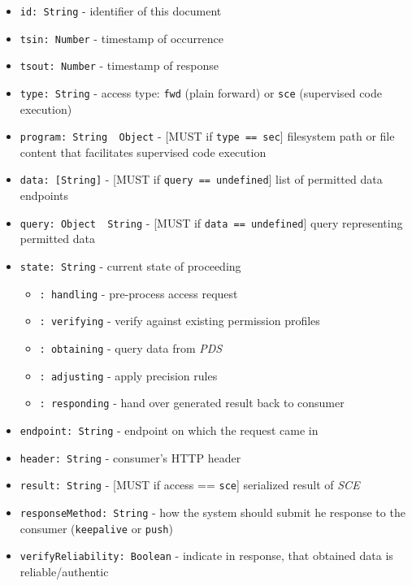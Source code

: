 \documentclass[12pt,english,a4paper,titlepage,cleardoublepage=empty,dottedtoc]{report}
\providecommand{\tightlist}{%
  \setlength{\itemsep}{0pt}\setlength{\parskip}{0pt}}
\begin{document}
\begin{itemize}
\tightlist
\item
  \texttt{id:\ String} - identifier of this document
\item
  \texttt{tsin:\ Number} - timestamp of occurrence
\item
  \texttt{tsout:\ Number} - timestamp of response
\item
  \texttt{type:\ String} - access type: \texttt{fwd} (plain forward) or
  \texttt{sce} (supervised code execution)
\item
  \texttt{program:\ String\ \textbar{}\textbar{}\ Object} - {[}MUST if
  \texttt{type\ ==\ \textquotesingle{}sec\textquotesingle{}}{]}
  filesystem path or file content that facilitates supervised code
  execution
\item
  \texttt{data:\ {[}String{]}} - {[}MUST if
  \texttt{query\ ==\ undefined}{]} list of permitted data endpoints
\item
  \texttt{query:\ Object\ \textbar{}\textbar{}\ String} - {[}MUST if
  \texttt{data\ ==\ undefined}{]} query representing permitted data
\item
  \texttt{state:\ String} - current state of proceeding

  \begin{itemize}
  \tightlist
  \item
    \texttt{:\ \textquotesingle{}handling\textquotesingle{}} -
    pre-process access request
  \item
    \texttt{:\ \textquotesingle{}verifying\textquotesingle{}} - verify
    against existing permission profiles
  \item
    \texttt{:\ \textquotesingle{}obtaining\textquotesingle{}} - query
    data from \emph{PDS}
  \item
    \texttt{:\ \textquotesingle{}adjusting\textquotesingle{}} - apply
    precision rules
  \item
    \texttt{:\ \textquotesingle{}responding\textquotesingle{}} - hand
    over generated result back to consumer
  \end{itemize}
\item
  \texttt{endpoint:\ String} - endpoint on which the request came in
\item
  \texttt{header:\ String} - consumer's HTTP header
\item
  \texttt{result:\ String} - {[}MUST if access ==
  \texttt{\textquotesingle{}sce\textquotesingle{}}{]} serialized result
  of \emph{SCE}
\item
  \texttt{responseMethod:\ String} - how the system should submit he
  response to the consumer (\texttt{keepalive} or \texttt{push})
\item
  \texttt{verifyReliability:\ Boolean} - indicate in response, that
  obtained data is reliable/authentic
\end{itemize}
\end{document}
